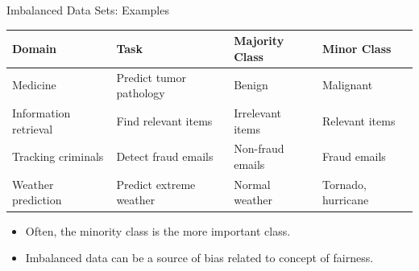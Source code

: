 \documentclass[11pt,compress,t,notes=noshow, xcolor=table]{beamer}
\begin{document}
\begin{vbframe}{Imbalanced Data Sets: Examples}
    \small
    \begin{table}[h]
        \scriptsize
        \centering
        \begin{tabular}{llll}
            \toprule
            \textbf{Domain} & \textbf{Task} & \textbf{Majority Class} & \textbf{Minor Class} \\ [5pt]
            \hline
            Medicine & Predict tumor pathology & Benign &  Malignant \\ [5pt]
            Information retrieval & Find relevant items & Irrelevant items & Relevant items \\ [5pt]
            Tracking criminals & Detect fraud emails & Non-fraud emails & Fraud emails \\ [5pt]
            Weather prediction & Predict extreme weather & Normal weather & Tornado, hurricane \\
            \hline
        \end{tabular}
    \end{table}
    
	\begin{itemize}
        \item Often, the minority class is the more important class.
        \item Imbalanced data can be a source of bias related to concept of fairness. %
	\end{itemize}

\end{vbframe}
\end{document}
